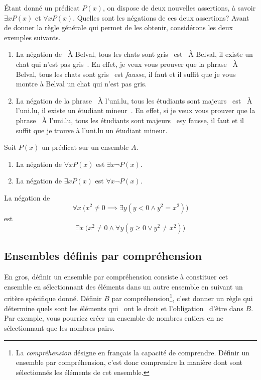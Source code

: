 \documentclass[french,course,oneside,theoremnosection]{lecture}
\begin{document}
Étant donné un prédicat $P(x)$, on dispose de deux nouvelles assertions, à savoir $\exists x P(x)$ et $\forall x P(x)$. Quelles sont les négations de ces deux assertions? Avant de donner la règle générale qui permet de les obtenir, considérons les deux exemples suivants.
\begin{enumerate}[(1)]
\item La négation de \og~À Belval, tous les chats sont gris~\fg{} est \og~À Belval, il existe un chat qui n'est pas gris~\fg{}. En effet, je veux vous prouver que la phrase \og~À Belval, tous les chats sont gris~\fg{} est \emph{fausse}, il faut et il suffit que je vous montre à Belval un chat qui n'est pas gris.
\item La négation de la phrase \og~À l'uni.lu, tous les étudiants sont majeurs~\fg{} est \og~À l'uni.lu, il existe un étudiant mineur~\fg. En effet, si je veux vous prouver que la phrase  \og~À l'uni.lu, tous les étudiants sont majeurs~\fg{} esy fausse, il faut et il suffit que je trouve à l'uni.lu un étudiant mineur.
\end{enumerate}

\begin{definition}
Soit $P(x)$ un prédicat sur un ensemble $A$.
\begin{enumerate}[(1)]
\item La négation de $\forall x P(x)$ est $\exists x \neg P(x)$.
\item La négation de $\exists x P(x)$ est $\forall x \neg P(x)$.
\end{enumerate}
\end{definition}
\begin{example}
La négation de 
\[
\forall x\ \big(x^2 \neq 0 \implies  \exists y (y <0 \wedge y^2=x^2)\big)
\]
est
\[
\exists x\ \big(x^2\neq 0 \wedge \forall y (y\geq 0 \vee y^2\neq x^2)\big)
\]
\end{example}

\subsection{Ensembles définis par compréhension}
En gros, définir un ensemble par compréhension consiste à constituer cet ensemble en sélectionnant des éléments dans un autre ensemble en suivant un critère spécifique donné. Définir $B$ par compréhension\footnote{La \emph{compréhension} désigne en français la capacité de comprendre. Définir un ensemble par compréhension, c'est donc comprendre la manière dont sont sélectionnés les éléments de cet ensemble.}, c'est donner un règle qui détermine quels sont les éléments qui  \og~ont le droit et l'obligation~\fg{} d'être dans $B$. Par exemple, vous pourriez créer un ensemble de nombres entiers en ne sélectionnant que les nombres pairs.
\end{document}
